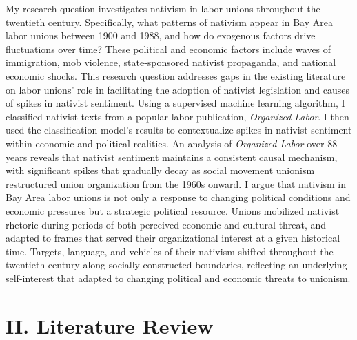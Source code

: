 \documentclass[12pt,a4paper]{article}
\begin{document}
My research question investigates nativism in labor unions throughout the twentieth century. Specifically, what patterns of nativism appear in Bay Area labor unions between 1900 and 1988, and how do exogenous factors drive fluctuations over time? These political and economic factors include waves of immigration, mob violence, state-sponsored nativist propaganda, and national economic shocks. This research question addresses gaps in the existing literature on labor unions' role in facilitating the adoption of nativist legislation and causes of spikes in nativist sentiment. Using a supervised machine learning algorithm, I classified nativist texts from a popular labor publication, \textit{Organized Labor}. I then used the classification model's results to contextualize spikes in nativist sentiment within economic and political realities. An analysis of \textit{Organized Labor} over 88 years reveals that nativist sentiment maintains a consistent causal mechanism, with significant spikes that gradually decay as social movement unionism restructured union organization from the 1960s onward. I argue that nativism in Bay Area labor unions is not only a response to changing political conditions and economic pressures but a strategic political resource. Unions mobilized nativist rhetoric during periods of both perceived economic and cultural threat, and adapted to frames that served their organizational interest at a given historical time. Targets, language, and vehicles of their nativism shifted throughout the twentieth century along socially constructed boundaries, reflecting an underlying self-interest that adapted to changing political and economic threats to unionism.


\section*{II. Literature Review}

\end{document}
